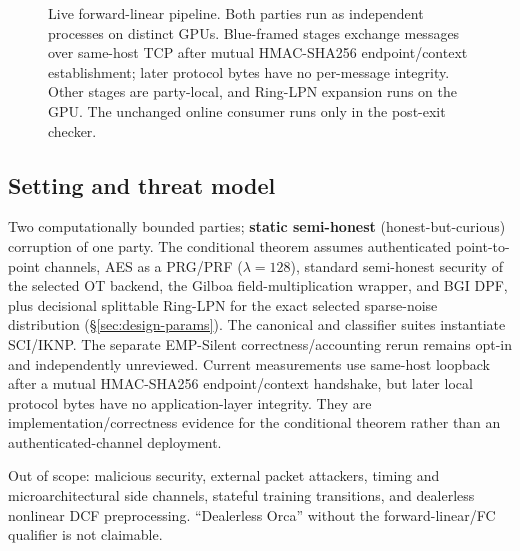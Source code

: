 \documentclass[11pt]{article}
\begin{document}
\begin{figure}[t]
\caption{Live forward-linear pipeline. Both parties run as independent
processes on distinct GPUs. Blue-framed stages exchange messages over same-host
TCP after mutual HMAC-SHA256 endpoint/context establishment; later protocol
bytes have no per-message integrity. Other stages are party-local, and
Ring-LPN expansion runs on the GPU. The unchanged online consumer runs only in
the post-exit checker.}
\label{fig:pipeline}
\end{figure}

\subsection{Setting and threat model}
\label{sec:threat}

Two computationally bounded parties; \textbf{static semi-honest}
(honest-but-curious) corruption of one party. The conditional theorem assumes
authenticated point-to-point channels, AES as a PRG/PRF
($\lambda{=}128$), standard semi-honest security of the selected OT backend,
the Gilboa field-multiplication wrapper, and BGI DPF, plus decisional
splittable Ring-LPN for the exact selected sparse-noise distribution
(\S\ref{sec:design-params}). The canonical and classifier suites instantiate
SCI/IKNP. The separate EMP-Silent correctness/accounting rerun remains opt-in
and independently unreviewed. Current measurements use same-host loopback after
a mutual HMAC-SHA256 endpoint/context handshake, but later local protocol bytes
have no application-layer integrity. They are implementation/correctness
evidence for the conditional theorem rather than an authenticated-channel
deployment.

Out of scope: malicious security, external packet attackers, timing and
microarchitectural side channels, stateful training transitions, and
dealerless nonlinear DCF preprocessing. ``Dealerless Orca'' without the
forward-linear/FC qualifier is not claimable.
\end{document}
